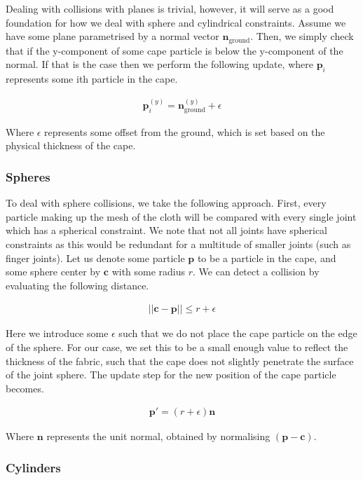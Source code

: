 \documentclass{article}
\begin{document}
Dealing with collisions with planes is trivial, however, it will serve as a good foundation for how we deal with
sphere and cylindrical constraints. Assume we have some plane parametrised by a normal vector $\mathbf{n}_{\text{ground}}$.
Then, we simply check that if the y-component of some cape particle is below the y-component of the normal. If that is the
case then we perform the following update, where $\mathbf{p}_i$ represents some ith particle in the cape.

\begin{align}
  \mathbf{p}^{(y)}_i = \mathbf{n}^{(y)}_{\text{ground}} + \epsilon
\end{align}

Where $\epsilon$ represents some offset from the ground, which is set based on the physical thickness of the cape.

\subsubsection{Spheres}

To deal with sphere collisions, we take the following approach. First, every particle making up the mesh
of the cloth will be compared with every single joint which has a spherical constraint. We note that not
all joints have spherical constraints as this would be redundant for a multitude of smaller joints (such as
finger joints). Let us denote some particle $\mathbf{p}$ to be a particle in the cape, and some sphere center
by $\mathbf{c}$ with some radius $r$. We can detect a collision by evaluating the following distance.

\begin{align}
  ||\mathbf{c} - \mathbf{p}|| \leq r + \epsilon
\end{align}

Here we introduce some $\epsilon$ such that we do not place the cape particle on the edge of the sphere.
For our case, we set this to be a small enough value to reflect the thickness of the fabric, such that the
cape does not slightly penetrate the surface of the joint sphere. The update step for the new position of
the cape particle becomes.

\begin{align}
  \mathbf{p}' = (r + \epsilon) \mathbf{n}
\end{align}

Where $\mathbf{n}$ represents the unit normal, obtained by normalising $(\mathbf{p} - \mathbf{c})$.

\subsubsection{Cylinders}
\end{document}
